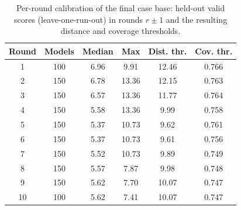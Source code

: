 \begin{table}[!t]
\centering
\caption{Per-round calibration of the final case base: held-out valid scores (leave-one-run-out) in rounds $r\pm1$ and the resulting distance and coverage thresholds.}
\label{tab:calibration}
\footnotesize
\setlength{\tabcolsep}{4pt}
\begin{tabular}{@{}cccccc@{}}
\toprule
\textbf{Round} & \textbf{Models} & \textbf{Median} & \textbf{Max} & \textbf{Dist. thr.} & \textbf{Cov. thr.} \\
\midrule
1 & 100 & 6.96 & 9.91 & 12.46 & 0.766 \\
2 & 150 & 6.78 & 13.36 & 12.15 & 0.763 \\
3 & 150 & 6.57 & 13.36 & 11.77 & 0.764 \\
4 & 150 & 5.58 & 13.36 & 9.99 & 0.758 \\
5 & 150 & 5.37 & 10.73 & 9.62 & 0.761 \\
6 & 150 & 5.37 & 10.73 & 9.61 & 0.756 \\
7 & 150 & 5.52 & 10.73 & 9.89 & 0.749 \\
8 & 150 & 5.57 & 7.87 & 9.98 & 0.748 \\
9 & 150 & 5.62 & 7.70 & 10.07 & 0.747 \\
10 & 100 & 5.62 & 7.41 & 10.07 & 0.747 \\
\bottomrule
\end{tabular}
\end{table}
